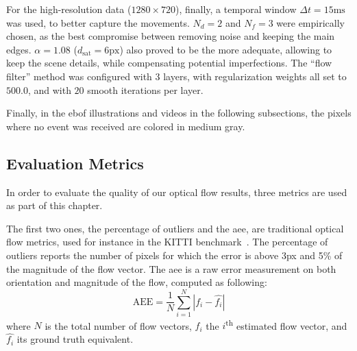 For the high-resolution data (\(1280\times720\)), finally, a temporal window \(\Delta t = 15\text{ms}\) was used, to better capture the movements. \(N_d = 2\) and \(N_f = 3\) were empirically chosen, as the best compromise between removing noise and keeping the main edges. \(\alpha=1.08\) (\(d_\text{sat} = 6\text{px}\)) also proved to be the more adequate, allowing to keep the scene details, while compensating potential imperfections. The ``flow filter'' method was configured with 3 layers, with regularization weights all set to \(500.0\), and with \(20\) smooth iterations per layer.

Finally, in the \acrshort{ebof} illustrations and videos in the following subsections, the pixels where no event was received are colored in medium gray.

\subsection{Evaluation Metrics}
In order to evaluate the quality of our optical flow results, three metrics are used as part of this chapter.

The first two ones, the percentage of outliers and the \acrfull{aee}, are traditional optical flow metrics, used for instance in the KITTI benchmark~\cite{Geiger2012AreWR}. The percentage of outliers reports the number of pixels for which the error is above 3px and 5\% of the magnitude of the flow vector. The \acrshort{aee} is a raw error measurement on both orientation and magnitude of the flow, computed as following:
\begin{equation}\label{eq:ebof:aee}
  \text{AEE} = \frac{1}{N}\sum_{i=1}^{N}|f_i-\hat{f_i}|
\end{equation}
where \(N\) is the total number of flow vectors, \(f_i\) the \(i\)\textsuperscript{th} estimated flow vector, and \(\hat{f_i}\) its ground truth equivalent.

